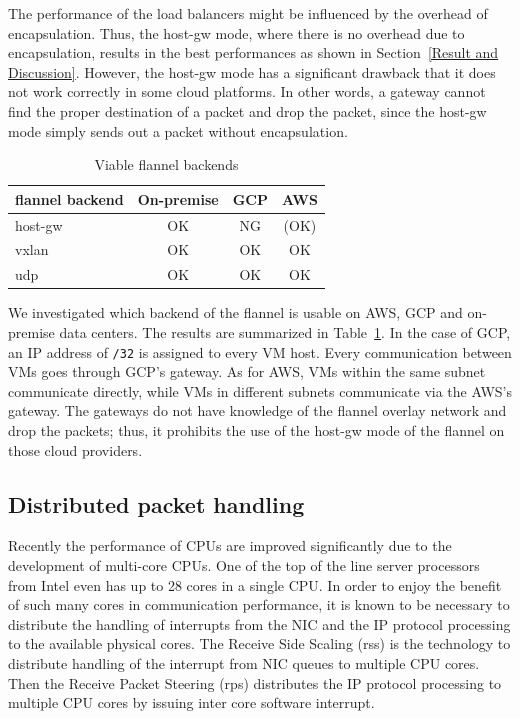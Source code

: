 The performance of the load balancers might be influenced by the overhead of encapsulation. 
Thus, the host-gw mode, where there is no overhead due to encapsulation, 
results in the best performances as shown in Section~\ref{Result and Discussion}.
However, the host-gw mode has a significant drawback that it does not work correctly in some cloud platforms. 
In other words, a gateway cannot find the proper destination of a packet and drop the packet, 
since the host-gw mode simply sends out a packet without encapsulation.

\begin{table}
  \begin{tabular}{lccc}
    \toprule
    flannel backend & On-premise & GCP & AWS \\
    \midrule
    host-gw & OK & NG & (OK) \\
    vxlan & OK & OK & OK \\
    udp & OK & OK & OK \\
    \bottomrule
\end{tabular}
  \caption{Viable flannel backends}
  \label{tab:Viable flannel backends}
\end{table}

We investigated which backend of the flannel is usable on AWS, GCP and on-premise data centers.
The results are summarized in Table~\ref{tab:Viable flannel backends}. 
In the case of GCP, an IP address of {\tt /32} is assigned to every VM host.
Every communication between VMs goes through GCP's gateway.
As for AWS, VMs within the same subnet communicate directly, while VMs in different subnets communicate via the AWS's gateway.
The gateways do not have knowledge of the flannel overlay network and drop the packets; thus, 
it prohibits the use of the host-gw mode of the flannel on those cloud providers.  

\subsection{Distributed packet handling}

Recently the performance of CPUs are improved significantly due to the development of multi-core CPUs.
One of the top of the line server processors from Intel even has up to 28 cores in a single CPU.
In order to enjoy the benefit of such many cores in communication performance, 
it is known to be necessary to distribute the handling of interrupts from the NIC and the IP protocol processing
to the available physical cores.
The Receive Side Scaling (rss)\cite{TomHerbert} is the technology 
to distribute handling of the interrupt from NIC queues to multiple CPU cores.
Then the Receive Packet Steering (rps)\cite{TomHerbert} distributes the IP protocol processing 
to multiple CPU cores by issuing inter core software interrupt.

